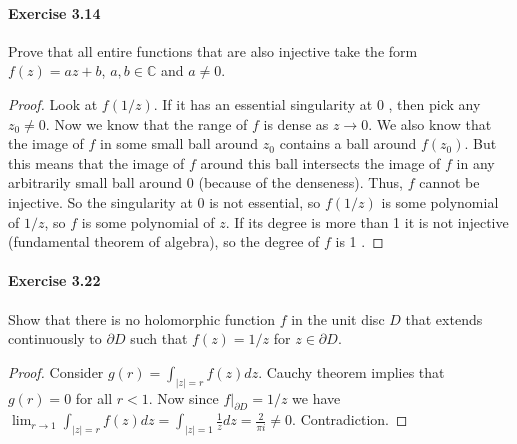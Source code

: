 \documentclass{article}
\begin{document}
\paragraph{Exercise 3.14} Prove that all entire functions that are also injective take the form $f(z) = az + b$, $a, b \in \mathbb{C}$ and $a \neq 0$.
\begin{proof}
Look at $f(1 / z)$. If it has an essential singularity at 0 , then pick any $z_0 \neq 0$. Now we know that the range of $f$ is dense as $z \rightarrow 0$. We also know that the image of $f$ in some small ball around $z_0$ contains a ball around $f\left(z_0\right)$. But this means that the image of $f$ around this ball intersects the image of $f$ in any arbitrarily small ball around 0 (because of the denseness). Thus, $f$ cannot be injective. So the singularity at 0 is not essential, so $f(1 / z)$ is some polynomial of $1 / z$, so $f$ is some polynomial of $z$. If its degree is more than 1 it is not injective (fundamental theorem of algebra), so the degree of $f$ is 1 .
\end{proof}



\paragraph{Exercise 3.22} Show that there is no holomorphic function $f$ in the unit disc $D$ that extends continuously to $\partial D$ such that $f(z) = 1/z$ for $z \in \partial D$.
\begin{proof}
    Consider $g(r)=\int_{|z|=r} f(z) d z$. Cauchy theorem implies that $g(r)=0$ for all $r<1$. Now since $\left.f\right|_{\partial D}=1 / z$ we have $\lim _{r \rightarrow 1} \int_{|z|=r} f(z) d z=\int_{|z|=1} \frac{1}{z} d z=\frac{2}{\pi i} \neq 0$. Contradiction.
\end{proof}
\end{document}
